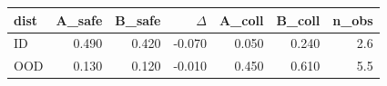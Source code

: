 \begin{tabular}{lrrrrrr}
\toprule
dist & A\_safe & B\_safe & $\Delta$ & A\_coll & B\_coll & n\_obs \\
\midrule
ID & 0.490 & 0.420 & -0.070 & 0.050 & 0.240 & 2.6 \\
OOD & 0.130 & 0.120 & -0.010 & 0.450 & 0.610 & 5.5 \\
\bottomrule
\end{tabular}
